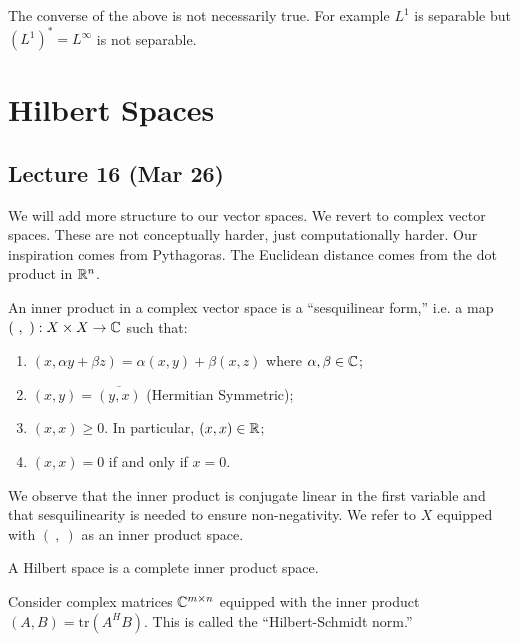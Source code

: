 \documentclass[10pt, twoside]{article}
\begin{document}
    \begin{rmk} The converse of the above is not necessarily true. For example
    $L^1$ is separable but $(L^1)^* = L^{\infty}$ is not separable.  \end{rmk}

    \section{Hilbert Spaces} \subsection{Lecture 16 (Mar 26)}

    We will add more structure to our vector spaces. We revert to complex
    vector spaces. These are not conceptually harder, just computationally
    harder. Our inspiration comes from Pythagoras. The Euclidean distance comes
    from the dot product in $\mathbb{R}^n$.

    \begin{defn} An inner product in a complex vector space is a
        ``sesquilinear form,'' i.e. a map $(\ ,\ ): X \times X \to \mathbb{C}$ such
        that: \begin{enumerate} \item $(x, \alpha y + \beta z) = \alpha(x,y) +
            \beta(x,z)$ where $\alpha, \beta \in \mathbb{C}$; \item $(x,y) =
    \overline{(y,x)}$ (Hermitian Symmetric); \item $(x,x) \geq 0$. In
    particular, $(x,x) \in \mathbb{R}$; \item $(x,x) = 0$ if and only if $x = 0$.
    \end{enumerate} \end{defn}

    We observe that the inner product is conjugate linear in the first variable
    and that sesquilinearity is needed to ensure non-negativity. We refer to
    $X$ equipped with $(\ , \ )$ as an inner product space.

    \begin{defn} A Hilbert space is a complete inner product
    space.  \end{defn}

    \begin{exm} Consider complex matrices $\mathbb{C}^{m \times n}$ equipped with the
    inner product $(A,B) = \mathrm{tr}(A^HB)$. This is called the
``Hilbert-Schmidt norm.'' \end{exm}
\end{document}
